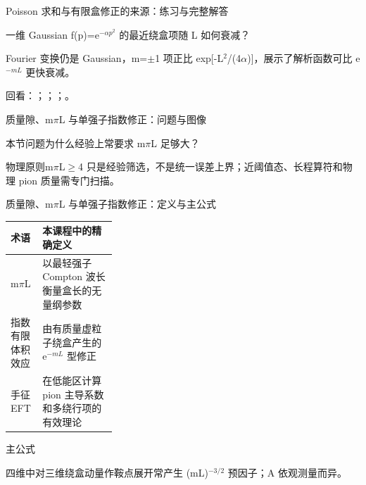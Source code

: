 \begin{frame}[t]{Poisson 求和与有限盒修正的来源：练习与完整解答}
\footnotesize
\begin{block}{}一维 Gaussian f(p)=e\ensuremath{^{-\alpha{}p^{2}}} 的最近绕盒项随 L 如何衰减？\end{block}
\begin{exampleblock}{}Fourier 变换仍是 Gaussian，m=\ensuremath{\pm}1 项正比 exp[-L\ensuremath{^{2}}/\allowbreak{}(4\ensuremath{\alpha})]，展示了解析函数可比 e\ensuremath{^{-mL}} 更快衰减。\end{exampleblock}
\vfill
\scriptsize 回看：；；；。
\end{frame}

\begin{frame}[t]{质量隙、m\ensuremath{\pi}L 与单强子指数修正：问题与图像}
\footnotesize
\begin{block}{本节问题}为什么经验上常要求 m\ensuremath{\pi}L 足够大？\end{block}
\begin{block}{物理原则}\quad m\ensuremath{\pi}L\ensuremath{\ge}4 只是经验筛选，不是统一误差上界；近阈值态、长程算符和物理 pion 质量需专门扫描。\end{block}
\end{frame}

\begin{frame}[t]{质量隙、m\ensuremath{\pi}L 与单强子指数修正：定义与主公式}
\footnotesize\begin{tabularx}{\linewidth}{p{0.30\linewidth}Y}
\toprule 术语 & 本课程中的精确定义\\\midrule
{} m\ensuremath{\pi}L & 以最轻强子 Compton 波长衡量盒长的无量纲参数\\
 指数有限体积效应 & 由有质量虚粒子绕盒产生的 e\ensuremath{^{-mL}} 型修正\\
 手征 EFT & 在低能区计算 pion 主导系数和多绕行项的有效理论\\
\bottomrule\end{tabularx}\vspace{0.15cm}
\begin{block}{ 主公式}\centering{}\end{block}
四维中对三维绕盒动量作鞍点展开常产生 (mL)\ensuremath{^{-3/2}} 预因子；A 依观测量而异。
\end{frame}

